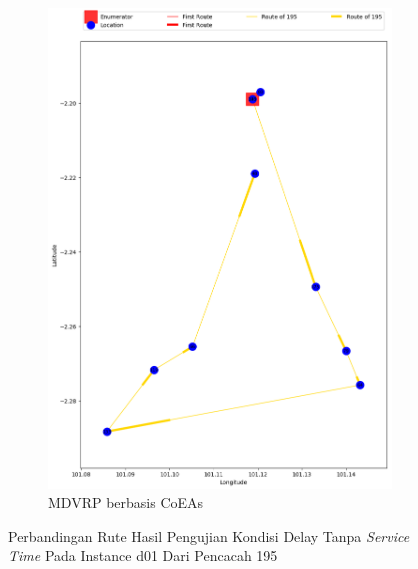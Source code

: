 \begin{figure}[H]
	\centering
	\begin{subfigure}[t]{\textwidth}
		\centering
		\includegraphics[width=\textwidth]{Resources/Images/delayed_1/real_m15_n100_delayed_1_195_coes}
		\caption{MDVRP berbasis CoEAs}
		\label{fig:real_m15_n100_delayed_1_195_coes}
	\end{subfigure}
	\caption{Perbandingan Rute Hasil Pengujian Kondisi Delay Tanpa \textit{Service Time} Pada Instance d01 Dari Pencacah 195}
	\label{fig:real_m15_n100_delayed_1_195}
\end{figure}


